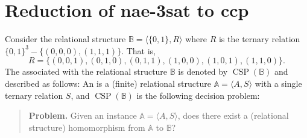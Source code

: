 \documentclass[12pt]{amsart}
\numberwithin{equation}{section}
\theoremstyle{plain}
\theoremstyle{definition}
\newcommand{\ccp}{\acs{ccp}\xspace}
\newcommand{\sat}{\acs{sat}\xspace}
\newcommand{\nae}{\acs{nae}\xspace}
\newcommand{\NP}{\acs{NP}\xspace}
\begin{document}



\section{Reduction of \nae-3\sat to \ccp}
\label{sec:reduction-nae-3sat}
Consider the relational structure $\mathbb B = \langle \{0, 1\}, R\rangle$
where $R$ is the ternary relation $\{0, 1\}^3 - \{(0,0,0), (1,1,1)\}$.
That is,
\[ R = \{(0,0,1), (0,1,0), (0,1,1), (1,0,0), (1,0,1), (1,1,0)\}.\]
The \csp associated with the relational structure $\mathbb B$
is denoted by $\operatorname{CSP}(\mathbb B)$ and described as follows:
An  %
is a (finite) relational structure $\mathbb A = \langle A, S \rangle$
with a single ternary relation $S$, and $\operatorname{CSP}(\mathbb B)$ is the
following decision problem:

\begin{quote}
{\bf Problem.} Given an instance $\mathbb A = \langle A, S \rangle$,
does there exist a (relational structure) homomorphism from $\mathbb A$ to $\mathbb B$?
\end{quote}
\end{document}
